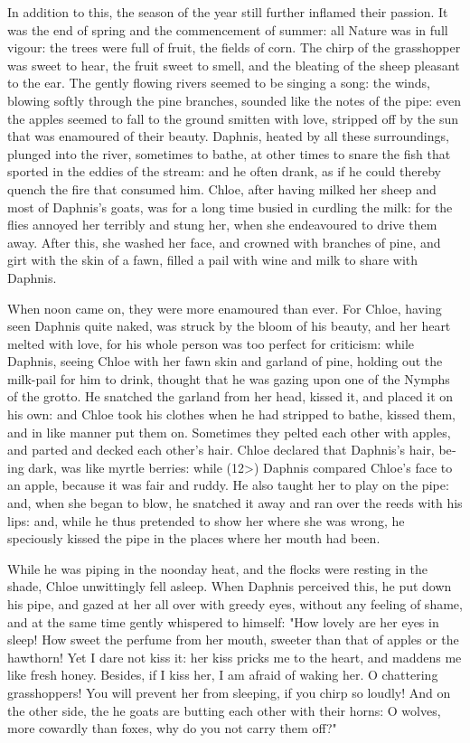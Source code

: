 \documentclass{book}
\begin{document}
\begin{pairs}
\begin{Rightside}
\begin{english}
  In addition to this, the season of the year still further inflamed their passion.  It was the end of spring and the commencement of summer: all Nature was in full vigour: the trees were full of fruit, the fields of corn.  The chirp of the grasshopper was sweet to hear, the fruit sweet to smell, and the bleating of the sheep pleasant to the ear.  The gently flowing rivers seemed to be singing a song: the winds, blowing softly through the pine branches, sounded like the notes of the pipe: even the apples seemed to fall to the ground smitten with love, stripped off by the sun that was enamoured of their beauty.  Daphnis, heated by all these surroundings, plunged into the river, sometimes to bathe, at other times to snare the fish that sported in the eddies of the stream: and he often drank, as if he could thereby quench the fire that consumed him.  Chloe, after having milked her sheep and most of Daphnis's goats, was for a long time busied in curdling the milk: for the flies annoyed her terribly and stung her, when she endeavoured to drive them away.  After this, she washed her face, and crowned with branches of pine, and girt with the skin of a fawn, filled a pail with wine and milk to share with Daphnis.
\pend


  When noon came on, they were more enamoured than ever.  For Chloe, having seen Daphnis quite naked, was struck by the bloom of his beauty, and her heart melted with love, for his whole person was too perfect for criticism: while Daphnis, seeing Chloe with her fawn skin and garland of pine, holding out the milk-pail for him to drink, thought that he was gazing upon one of the Nymphs of the grotto.  He snatched the garland from her head, kissed it, and placed it on his own: and Chloe took his clothes when he had stripped to bathe, kissed them, and in like manner put them on.  Sometimes they pelted each other with apples, and parted and decked each other's hair.  Chloe declared that Daphnis's hair, being dark, was like myrtle berries: while (12>) Daphnis compared Chloe's face to an apple, because it was fair and ruddy. He also taught her to play on the pipe: and, when she began to blow, he snatched it away and ran over the reeds with his lips: and, while he thus pretended to show her where she was wrong, he speciously kissed the pipe in the places where her mouth had been.
\pend


  While he was piping in the noonday heat, and the flocks were resting in the shade, Chloe unwittingly fell asleep.  When Daphnis perceived this, he put down his pipe, and gazed at her all over with greedy eyes, without any feeling of shame, and at the same time gently whispered to himself: "How lovely are her eyes in sleep!  How sweet the perfume from her mouth, sweeter than that of apples or the hawthorn!  Yet I dare not kiss it: her kiss pricks me to the heart, and maddens me like fresh honey.  Besides, if I kiss her, I am afraid of waking her.  O chattering grasshoppers!  You will prevent her from sleeping, if you chirp so loudly!  And on the other side, the he goats are butting each other with their horns: O wolves, more cowardly than foxes, why do you not carry them off?"
\pend



\end{english}
\end{Rightside}
\end{pairs}
\end{document}
